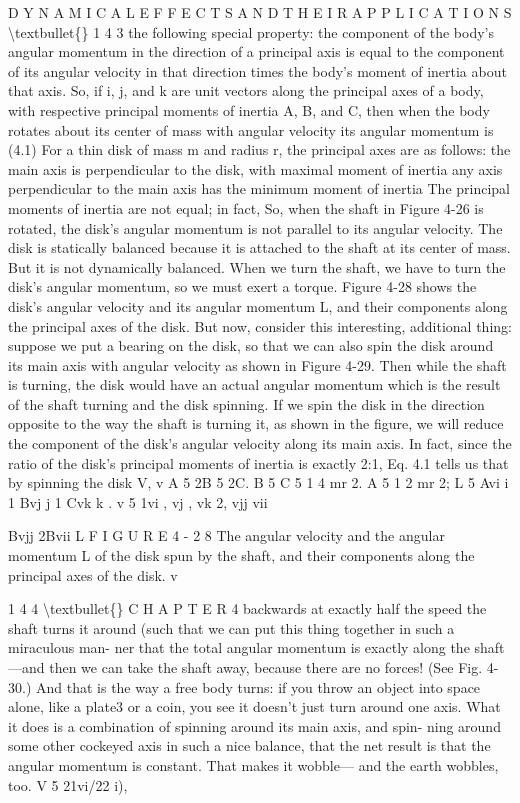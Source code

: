 \documentclass[10pt,oneside]{article}
\begin{document}
D Y N A M I C A L  E F F E C T S  A N D  T H E I R  A P P L I C A T I O N S \textbackslash{}textbullet\{\} 1 4 3 the following special property: the component of the body’s angular momentum in the direction of a principal axis is equal to the component of its angular velocity in that direction times the body’s moment of inertia about that axis. So, if i, j, and k are unit vectors along the principal axes of a body, with respective principal moments of inertia A, B, and C, then when the body rotates about its center of mass with angular velocity its angular momentum is (4.1) For a thin disk of mass m and radius r, the principal axes are as follows: the main axis is perpendicular to the disk, with maximal moment of inertia any axis perpendicular to the main axis has the minimum moment of inertia The principal moments of inertia are not equal; in fact, So, when the shaft in Figure 4-26 is rotated, the disk’s angular momentum is not parallel to its angular velocity. The disk is statically balanced because it is attached to the shaft at its center of mass. But it is not dynamically balanced. When we turn the shaft, we have to turn the disk’s angular momentum, so we must exert a torque. Figure 4-28 shows the disk’s angular velocity and its angular momentum L, and their components along the principal axes of the disk. But now, consider this interesting, additional thing: suppose we put a bearing on the disk, so that we can also spin the disk around its main axis with angular velocity as shown in Figure 4-29. Then while the shaft is turning, the disk would have an actual angular momentum which is the result of the shaft turning and the disk spinning. If we spin the disk in the direction opposite to the way the shaft is turning it, as shown in the figure, we will reduce the component of the disk’s angular velocity along its main axis. In fact, since the ratio of the disk’s principal moments of inertia is exactly 2:1, Eq. 4.1 tells us that by spinning the disk V, v A 5 2B 5 2C. B 5 C 5 1 4 mr 2. A 5 1 2 mr 2; L 5 Avi i 1 Bvj j 1 Cvk k . v 5 1vi , vj , vk 2, vjj vii\par

Bvjj 2Bvii L F I G U R E  4 - 2 8 The angular velocity and the angular momentum L of the disk spun by the shaft, and their components along the principal axes of the disk. v\par

1 4 4 \textbackslash{}textbullet\{\} C H A P T E R  4 backwards at exactly half the speed the shaft turns it around (such that we can put this thing together in such a miraculous man- ner that the total angular momentum is exactly along the shaft---and then we can take the shaft away, because there are no forces! (See Fig. 4-30.) And that is the way a free body turns: if you throw an object into space alone, like a plate3 or a coin, you see it doesn’t just turn around one axis. What it does is a combination of spinning around its main axis, and spin- ning around some other cockeyed axis in such a nice balance, that the net result is that the angular momentum is constant. That makes it wobble--- and the earth wobbles, too. V 5 21vi/22  i),\par
\end{document}
